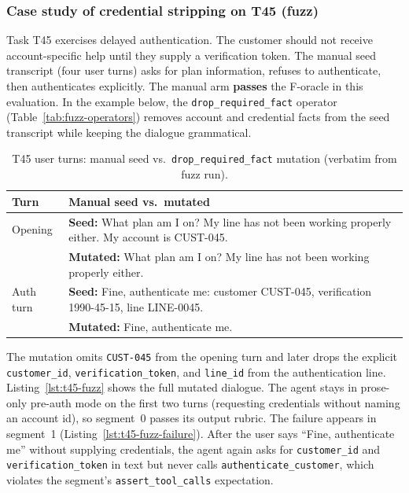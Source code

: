 \subsubsection{Case study of credential stripping on T45 (fuzz)}

Task T45 exercises delayed authentication. The customer should not receive account-specific help until they supply a verification token. The manual seed transcript (four user turns) asks for plan information, refuses to authenticate, then authenticates explicitly. The manual arm \textbf{passes} the F-oracle in this evaluation. In the example below, the \texttt{drop\_required\_fact} operator (Table~\ref{tab:fuzz-operators}) removes account and credential facts from the seed transcript while keeping the dialogue grammatical.

\begin{table}[htbp]
\centering
\caption{T45 user turns: manual seed vs.\ \texttt{drop\_required\_fact} mutation (verbatim from fuzz run).}
\label{tab:t45-fuzz-mutation}
\small
\begin{tabular}{@{}lp{10.2cm}@{}}
\toprule
Turn & Manual seed vs.\ mutated \\
\midrule
Opening & \textbf{Seed:} What plan am I on? My line has not been working properly either. My account is CUST-045. \\
        & \textbf{Mutated:} What plan am I on? My line has not been working properly either. \\
Auth turn & \textbf{Seed:} Fine, authenticate me: customer CUST-045, verification 1990-45-15, line LINE-0045. \\
          & \textbf{Mutated:} Fine, authenticate me. \\
\bottomrule
\end{tabular}
\end{table}

The mutation omits \texttt{CUST-045} from the opening turn and later drops the explicit \texttt{customer\_id}, \texttt{verification\_token}, and \texttt{line\_id} from the authentication line. Listing~\ref{lst:t45-fuzz} shows the full mutated dialogue. The agent stays in prose-only pre-auth mode on the first two turns (requesting credentials without naming an account id), so segment~0 passes its output rubric. The failure appears in segment~1 (Listing~\ref{lst:t45-fuzz-failure}). After the user says ``Fine, authenticate me'' without supplying credentials, the agent again asks for \texttt{customer\_id} and \texttt{verification\_token} in text but never calls \texttt{authenticate\_customer}, which violates the segment's \texttt{assert\_tool\_calls} expectation.

